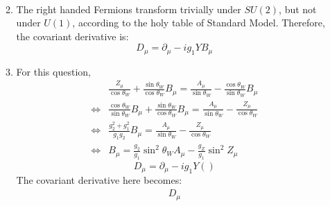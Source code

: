 \documentclass[12pt,a4]{article}
\begin{document}
\begin{enumerate}
\begin{enumerate}
\begin{align*}
        \end{align*}
      \item
        The right handed Fermions transform trivially under $SU(2)$, but not under $U(1)$, according to the holy table of Standard Model.
        Therefore, the covariant derivative is:
        \begin{equation*}
          D_\mu = \partial_\mu - i g_1 Y B_\mu
        \end{equation*}
      \item
        For this question, 
        \begin{align*}
                          & \frac{Z_\mu}{\cos \theta_W} + \frac{\sin \theta_W}{\cos \theta_W} B_\mu=  \frac{A_\mu}{\sin \theta_W} - \frac{\cos \theta_W}{\sin \theta_W} B_\mu\\
          \Leftrightarrow & \frac{\cos \theta_W}{\sin \theta_W} B_\mu + \frac{\sin \theta_W}{\cos \theta_W} B_\mu =  \frac{A_\mu}{\sin \theta_W} - \frac{Z_\mu}{\cos \theta_W}\\
          \Leftrightarrow & \frac{g_2^2 + g_1^2}{g_1 g_2} B_\mu =  \frac{A_\mu}{\sin \theta_W} - \frac{Z_\mu}{\cos \theta_W}\\
          \Leftrightarrow & B_\mu  =  \frac{g_2}{g_1}\sin^2 \theta_W A_\mu - \frac{g_Z}{g_1} \sin^2 Z_\mu
        \end{align*}
        \begin{equation*}
          D_\mu = \partial_\mu - i g_1 Y ()
        \end{equation*}
        The covariant derivative here becomes:
        \begin{align*}
          D_\mu %

\end{align*}
\end{enumerate}
\end{enumerate}
\end{document}
